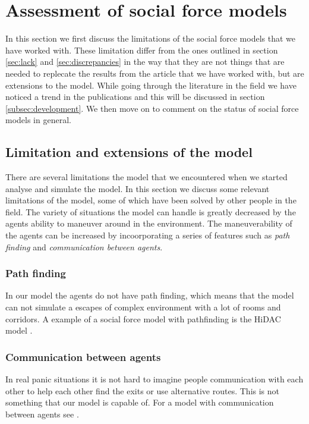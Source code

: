 \section{Assessment of social force models}
\label{sec:assessment}
In this section we first discuss the limitations of the social force models 
that we have worked with. These limitation differ from the ones outlined in 
section \ref{sec:lack} and \ref{sec:discrepancies} in the way that 
they are not things that are needed to replecate the results from the article 
that we have worked with, but are extensions to the model. While going through 
the literature in the field we have noticed a trend in the publications and this 
will be discussed in section \ref{subsec:development}. We then move on to comment 
on the status of social force models in general.

\subsection{Limitation and extensions of the model}
There are several limitations the model that we encountered when we started 
analyse and simulate the model. In this section we discuss some relevant 
limitations of the model, some of which have been solved by other people in the 
field. 
The variety of situations the model can handle is greatly decreased by the 
agents ability to maneuver around in the environment. The maneuverability of 
the agents can be increased by incoorporating a series of features such as 
\emph{path finding} and \emph{communication between agents}. 

\subsubsection{Path finding}
In our model the agents do not have path finding, which means that the model 
can not simulate a escapes of complex environment with a lot of rooms 
and corridors. A example of a social force model with pathfinding is the HiDAC 
model \cite{HiDAC}.

\subsubsection{Communication between agents}
In real panic situations it is not hard to imagine people communication with 
each other to help each other find the exits or use alternative routes. This is 
not something that our model is capable of. For a model with communication between 
agents see \cite{HiDAC}.

